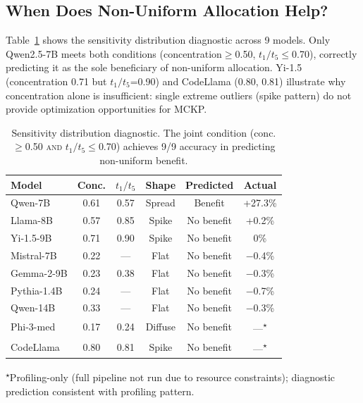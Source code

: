 \documentclass[11pt,a4paper]{article}
\begin{document}
\subsection{When Does Non-Uniform Allocation Help?}
\label{sec:when}

Table~\ref{tab:diagnostic} shows the sensitivity distribution diagnostic across 9 models.
Only Qwen2.5-7B meets both conditions (concentration$\ge$0.50, $t_1/t_5 \le$0.70), correctly predicting it as the sole beneficiary of non-uniform allocation.
Yi-1.5 (concentration 0.71 but $t_1/t_5$=0.90) and CodeLlama (0.80, 0.81) illustrate why concentration alone is insufficient: single extreme outliers (spike pattern) do not provide optimization opportunities for MCKP.

\begin{table}[t]
\centering
\small
\caption{Sensitivity distribution diagnostic. The joint condition (conc.$\ge$0.50 \textsc{and} $t_1/t_5 \le$0.70) achieves 9/9 accuracy in predicting non-uniform benefit.}
\label{tab:diagnostic}
\begin{tabular}{@{}lccccc@{}}
\toprule
\textbf{Model} & \textbf{Conc.} & $t_1/t_5$ & \textbf{Shape} & \textbf{Predicted} & \textbf{Actual} \\
\midrule
Qwen-7B & 0.61 & 0.57 & Spread & Benefit & +27.3\% \\
Llama-8B & 0.57 & 0.85 & Spike & No benefit & +0.2\% \\
Yi-1.5-9B & 0.71 & 0.90 & Spike & No benefit & 0\% \\
Mistral-7B & 0.22 & --- & Flat & No benefit & $-$0.4\% \\
Gemma-2-9B & 0.23 & 0.38 & Flat & No benefit & $-$0.3\% \\
Pythia-1.4B & 0.24 & --- & Flat & No benefit & $-$0.7\% \\
Qwen-14B & 0.33 & --- & Flat & No benefit & $-$0.3\% \\
Phi-3-med & 0.17 & 0.24 & Diffuse & No benefit & ---\textsuperscript{$\star$} \\
CodeLlama & 0.80 & 0.81 & Spike & No benefit & ---\textsuperscript{$\star$} \\
\bottomrule
\end{tabular}

\vspace{2pt}
{\footnotesize \textsuperscript{$\star$}Profiling-only (full pipeline not run due to resource constraints); diagnostic prediction consistent with profiling pattern.}
\end{table}
\end{document}
